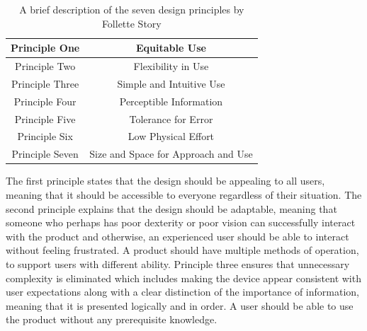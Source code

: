 \begin{table} [h]
    \begin{center}
        \vspace{5mm}
        \caption{A brief description of the seven design principles by Follette Story \cite{sevenprinciples}}
        \label{fig:DesignPrinciples}
        \begin{tabular}{ |c|c| } %
        \hline
        Principle One & Equitable Use \cite{sevenprinciples} \\
        \hline
        Principle Two & Flexibility in Use \cite{sevenprinciples} \\ 
        \hline
        Principle Three & Simple and Intuitive Use \cite{sevenprinciples} \\ 
        \hline
        Principle Four & Perceptible Information \cite{sevenprinciples} \\
        \hline 
        Principle Five & Tolerance for Error \cite{sevenprinciples} \\ 
        \hline
        Principle Six & Low Physical Effort \cite{sevenprinciples} \\ 
        \hline
        Principle Seven & Size and Space for Approach and Use \cite{sevenprinciples} \\
        \hline
        \end{tabular}
    \end{center}
\end{table}

The first principle states that the design should be appealing to all users, meaning that it should be accessible to everyone regardless of their situation.
The second principle explains that the design should be adaptable, meaning that someone who perhaps has poor dexterity or poor vision can successfully interact with the product and otherwise, an experienced user should be able to interact without feeling frustrated. %
A product should have multiple methods of operation, to support users with different ability.
Principle three ensures that unnecessary complexity is eliminated which includes making the device appear consistent with user expectations along with a clear distinction of the importance of information, meaning that it is presented logically and in order.
A user should be able to use the product without any prerequisite knowledge.

